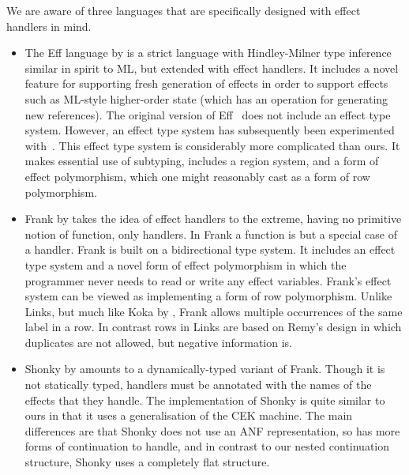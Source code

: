\documentclass[12pt,mscres,cdtppar,twoside,openright,logo,rightchapter,normalheadings]{infthesis}
\theoremstyle{definition}
\begin{document}
We are aware of three languages that are specifically designed with
effect handlers in mind.
%
\begin{itemize}
\item The Eff language by \cite{Bauer2015} is a strict language with
  Hindley-Milner type inference similar in spirit to ML, but extended
  with effect handlers.
%
It includes a novel feature for supporting fresh generation of effects
in order to support effects such as ML-style higher-order state (which
has an operation for generating new references).
%
The original version of Eff~\citep{Bauer2015} does not include an
effect type system. However, an effect type system has subsequently
been experimented with~\citep{BauerP13, Pretnar2014}.
%
This effect type system is considerably more complicated than ours. It
makes essential use of subtyping, includes a region system, and a form
of effect polymorphism, which one might reasonably cast as a form of
row polymorphism.

\item Frank by \cite{McBride2014} takes the idea of effect handlers to
  the extreme, having no primitive notion of function, only
  handlers. In Frank a function is but a special case of a handler.
  Frank is built on a bidirectional type system. It includes an effect
  type system and a novel form of effect polymorphism in which the
  programmer never needs to read or write any effect
  variables. Frank's effect system can be viewed as implementing a
  form of row polymorphism. Unlike Links, but much like
  Koka by \cite{Leijen14}, Frank allows multiple occurrences of the same
  label in a row. In contrast rows in Links are based on Remy's design
  in which duplicates are not allowed, but negative information is.

\item Shonky by \cite{McBride2016} amounts to a dynamically-typed variant
  of Frank. Though it is not statically typed, handlers must be
  annotated with the names of the effects that they handle. The
  implementation of Shonky is quite similar to ours in that it uses a
  generalisation of the CEK machine. The main differences are that
  Shonky does not use an ANF representation, so has more forms of
  continuation to handle, and in contrast to our nested continuation
  structure, Shonky uses a completely flat structure.
\end{itemize}
\end{document}
